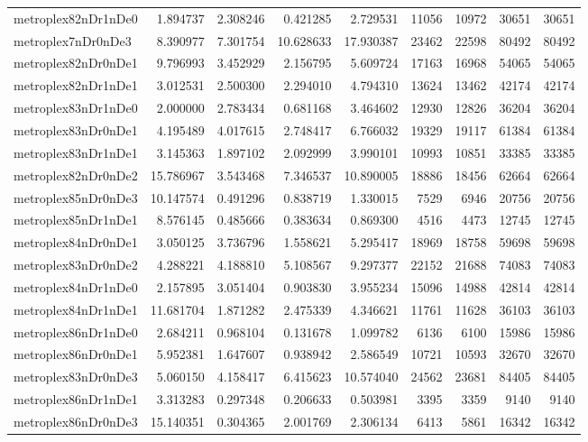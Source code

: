 \begin{longtable}{|l|r|r|r|r|r|r|r|r|}
metroplex82nDr1nDe0 & 1.894737 & 2.308246 & 0.421285 & 2.729531 & 11056 & 10972 & 30651 & 30651 \\
metroplex7nDr0nDe3 & 8.390977 & 7.301754 & 10.628633 & 17.930387 & 23462 & 22598 & 80492 & 80492 \\
metroplex82nDr0nDe1 & 9.796993 & 3.452929 & 2.156795 & 5.609724 & 17163 & 16968 & 54065 & 54065 \\
metroplex82nDr1nDe1 & 3.012531 & 2.500300 & 2.294010 & 4.794310 & 13624 & 13462 & 42174 & 42174 \\
metroplex83nDr1nDe0 & 2.000000 & 2.783434 & 0.681168 & 3.464602 & 12930 & 12826 & 36204 & 36204 \\
metroplex83nDr0nDe1 & 4.195489 & 4.017615 & 2.748417 & 6.766032 & 19329 & 19117 & 61384 & 61384 \\
metroplex83nDr1nDe1 & 3.145363 & 1.897102 & 2.092999 & 3.990101 & 10993 & 10851 & 33385 & 33385 \\
metroplex82nDr0nDe2 & 15.786967 & 3.543468 & 7.346537 & 10.890005 & 18886 & 18456 & 62664 & 62664 \\
metroplex85nDr0nDe3 & 10.147574 & 0.491296 & 0.838719 & 1.330015 & 7529 & 6946 & 20756 & 20756 \\
metroplex85nDr1nDe1 & 8.576145 & 0.485666 & 0.383634 & 0.869300 & 4516 & 4473 & 12745 & 12745 \\
metroplex84nDr0nDe1 & 3.050125 & 3.736796 & 1.558621 & 5.295417 & 18969 & 18758 & 59698 & 59698 \\
metroplex83nDr0nDe2 & 4.288221 & 4.188810 & 5.108567 & 9.297377 & 22152 & 21688 & 74083 & 74083 \\
metroplex84nDr1nDe0 & 2.157895 & 3.051404 & 0.903830 & 3.955234 & 15096 & 14988 & 42814 & 42814 \\
metroplex84nDr1nDe1 & 11.681704 & 1.871282 & 2.475339 & 4.346621 & 11761 & 11628 & 36103 & 36103 \\
metroplex86nDr1nDe0 & 2.684211 & 0.968104 & 0.131678 & 1.099782 & 6136 & 6100 & 15986 & 15986 \\
metroplex86nDr0nDe1 & 5.952381 & 1.647607 & 0.938942 & 2.586549 & 10721 & 10593 & 32670 & 32670 \\
metroplex83nDr0nDe3 & 5.060150 & 4.158417 & 6.415623 & 10.574040 & 24562 & 23681 & 84405 & 84405 \\
metroplex86nDr1nDe1 & 3.313283 & 0.297348 & 0.206633 & 0.503981 & 3395 & 3359 & 9140 & 9140 \\
metroplex86nDr0nDe3 & 15.140351 & 0.304365 & 2.001769 & 2.306134 & 6413 & 5861 & 16342 & 16342 \\

\end{longtable}
